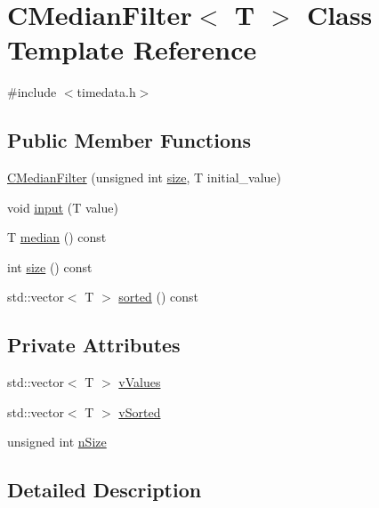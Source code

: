 \hypertarget{class_c_median_filter}{}\section{C\+Median\+Filter$<$ T $>$ Class Template Reference}
\label{class_c_median_filter}


{\ttfamily \#include $<$timedata.\+h$>$}

\subsection*{Public Member Functions}
\begin{DoxyCompactItemize}
\item 
\mbox{\hyperlink{class_c_median_filter_a181463ed081ece10fd437875243d9cad}{C\+Median\+Filter}} (unsigned int \mbox{\hyperlink{class_c_median_filter_a618073c8aa8504670182d40d7084501c}{size}}, T initial\+\_\+value)
\item 
void \mbox{\hyperlink{class_c_median_filter_ae10cde98866b034ec73c530be4c60874}{input}} (T value)
\item 
T \mbox{\hyperlink{class_c_median_filter_ade078740cdd0555adc2e52468d090c42}{median}} () const
\item 
int \mbox{\hyperlink{class_c_median_filter_a618073c8aa8504670182d40d7084501c}{size}} () const
\item 
std\+::vector$<$ T $>$ \mbox{\hyperlink{class_c_median_filter_a2ec3e6107c12dc2564f0323d39ecca1e}{sorted}} () const
\end{DoxyCompactItemize}
\subsection*{Private Attributes}
\begin{DoxyCompactItemize}
\item 
std\+::vector$<$ T $>$ \mbox{\hyperlink{class_c_median_filter_ae20afe1640996de11db4e97f4c3103fa}{v\+Values}}
\item 
std\+::vector$<$ T $>$ \mbox{\hyperlink{class_c_median_filter_a8290248907e4c1e89db51abb107b83a9}{v\+Sorted}}
\item 
unsigned int \mbox{\hyperlink{class_c_median_filter_a65ac3eedb12b1f782d1237dceefa8a4c}{n\+Size}}
\end{DoxyCompactItemize}


\subsection{Detailed Description}
